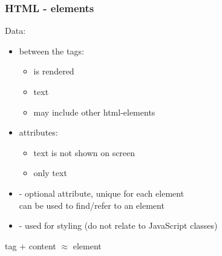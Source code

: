 \begin{frame}[fragile]
\frametitle{HTML - elements}
\color{structure}
Data:
\begin{itemize}\color{structure}
\item between the tags: 
  \begin{itemize}\color{structure}
  \item is rendered
  \item text 
  \item may include other html-elements 
  \end{itemize}
\end{itemize}

\begin{itemize}\color{structure}
\item attributes:  
  \begin{itemize}\color{structure}
    \item text is not shown on screen
    \item only text
  \end{itemize}
  \item {} - optional attribute, unique for each element\\ can be used to find/refer to an element
  \item {} - used for styling (do not relate to JavaScript classes)
\end{itemize}
\bigskip
tag + content $\approx$ element

\end{frame}

